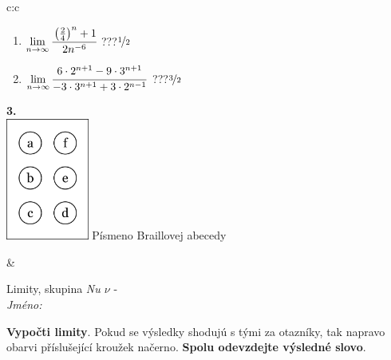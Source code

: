 \documentclass[10pt]{report}
\begin{document}
\begin{tabular}{c:c}
\begin{minipage}[c][104.5mm][t]{0.5\linewidth}
\begin{center}
\begin{minipage}{0.79\linewidth}
\begin{center}
\begin{varwidth}{\linewidth}
\begin{enumerate}
\item $\lim\limits_{n\to\infty}\cfrac{\left(\frac{2}{4}\right)^n +1}{2n^{-6}}$\quad \dotfill\; ???\;\dotfill \quad $\nicefrac{1}{2}$
\item $\lim\limits_{n\to\infty}\cfrac{6\cdot 2^{n+1}-9\cdot 3^{n+1}}{-3\cdot 3^{n+1}+3\cdot 2^{n-1}}$\quad \dotfill\; ???\;\dotfill \quad $\nicefrac{3}{2}$
\end{enumerate}
\end{varwidth}
\end{center}
\end{minipage}
\begin{minipage}{0.20\linewidth}
\begin{center}
{\Huge\bfseries 3.} \\[2mm]
\includegraphics[height=40mm]{../images/braille.png}
{\small Písmeno Braillovej abecedy}
\end{center}
\end{minipage}
\end{center}
\end{minipage}
&
\begin{minipage}[c][104.5mm][t]{0.5\linewidth}
\begin{center}
\vspace{7mm}
{\huge Limity, skupina \textit{Nu $\nu$} -}\\[5mm]
\textit{Jméno:}\phantom{xxxxxxxxxxxxxxxxxxxxxxxxxxxxxxxxxxxxxxxxxxxxxxxxxxxxxxxxxxxxxxxxx}\\[5mm]
\begin{minipage}{0.95\linewidth}
\begin{center}
\textbf{Vypočti limity}. Pokud se výsledky shodujú s tými za otazníky, tak napravo\\obarvi příslušející kroužek načerno. \textbf{Spolu odevzdejte výsledné slovo}.
\end{center}
\end{minipage}
\\[1mm]
\begin{minipage}{0.79\linewidth}
\begin{center}
\begin{varwidth}{\linewidth}

\end{varwidth}
\end{center}
\end{minipage}
\end{center}
\end{minipage}
\end{tabular}
\end{document}
